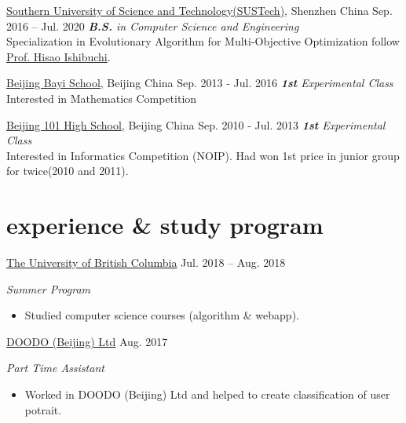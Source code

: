 \documentclass[hidelinks__VERSION__]{adamyi-cv}
\begin{document}
\begin{entrylist}


\entry
{\href{https://www.sustech.edu.cn/}{Southern University of Science and Technology(SUSTech)}, Shenzhen China}
{Sep. 2016 -- Jul. 2020}
{\emph{\textbf{B.S.} in Computer Science and Engineering}\\
Specialization in Evolutionary Algorithm for Multi-Objective Optimization follow \href{http://cse.sustc.edu.cn/en/people/view/people_id/55/sort_id/9/pid/}{Prof. Hisao Ishibuchi}.
}

\entry
{\href{http://bayims.cn/}{Beijing Bayi School}, Beijing China}
{Sep. 2013 - Jul. 2016}
{\emph{\textbf{1st} Experimental Class}\\
Interested in Mathematics Competition
}

\entry
{\href{http://beijing101.com}{Beijing 101 High School}, Beijing China}
{Sep. 2010 - Jul. 2013}
{\emph{\textbf{1st} Experimental Class}\\
Interested in Informatics Competition (NOIP). Had won 1st price in junior group for twice(2010 and 2011).
}

\end{entrylist}


\section{experience \& study program}

\begin{entrylist}


\entry
{\href{https://www.ubc.ca/}{The University of British Columbia}}
{Jul. 2018 -- Aug. 2018}
{\emph{Summer Program}
\begin{itemize}
\item Studied computer science courses (algorithm \& webapp).
\end{itemize}}


\entry
{\href{http://www.doodod.com/}{DOODO (Beijing) Ltd}}
{Aug. 2017}
{\emph{Part Time Assistant}
\begin{itemize}
\item Worked in DOODO (Beijing) Ltd and helped to create classification of user potrait.
\end{itemize}}


\end{entrylist}
\end{document}
